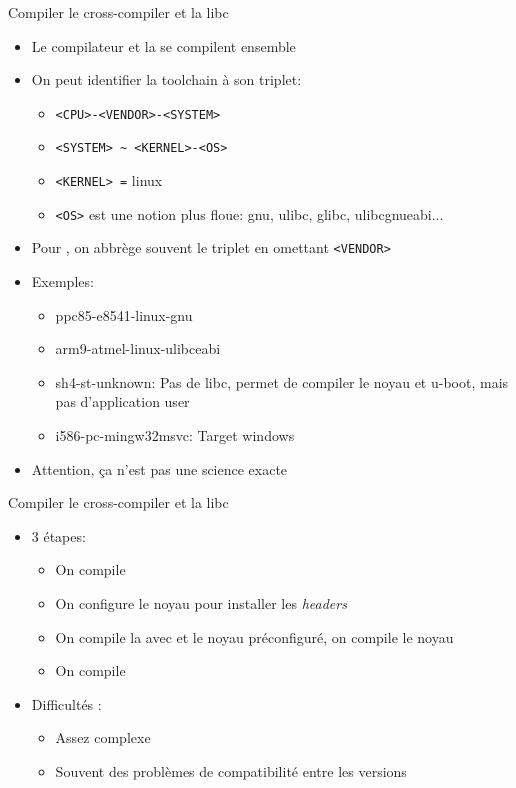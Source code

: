 \begin{frame}[fragile=singleslide]{Compiler le cross-compiler et la libc}
  \begin{itemize}
  \item Le compilateur et la  se compilent ensemble
  \item On peut identifier la toolchain à son triplet:
    \begin{itemize}
    \item \verb+<CPU>-<VENDOR>-<SYSTEM>+
    \item \verb+<SYSTEM> ~ <KERNEL>-<OS>+
    \item \verb+<KERNEL> =+ linux
    \item \verb+<OS>+  est une notion  plus floue: gnu,  ulibc, glibc,
      ulibcgnueabi...
    \end{itemize}
  \item  Pour ,  on abbrège  souvent le  triplet  en omettant
    \verb+<VENDOR>+
  \item Exemples: 
    \begin{itemize}
    \item ppc85-e8541-linux-gnu %
    \item arm9-atmel-linux-ulibceabi %
    \item sh4-st-unknown: Pas de libc, permet de compiler le noyau
      et u-boot, mais pas d'application user
    \item i586-pc-mingw32msvc: Target windows
    \end{itemize}
  \item Attention, ça n'est pas une science exacte
  \end{itemize}
\end{frame}

\begin{frame}[fragile=singleslide]{Compiler le cross-compiler et la libc}
  \begin{itemize}
  \item 3 étapes: 
    \begin{itemize}
    \item On compile 
    \item On configure le noyau pour installer les \emph{headers}
    \item On  compile la   avec   et le
      noyau préconfiguré, on compile le noyau
    \item On compile 
    \end{itemize}
  \item Difficultés :
    \begin{itemize}
    \item Assez complexe
    \item Souvent des problèmes de compatibilité entre les versions
    \end{itemize}
  \end{itemize}
\end{frame}    

